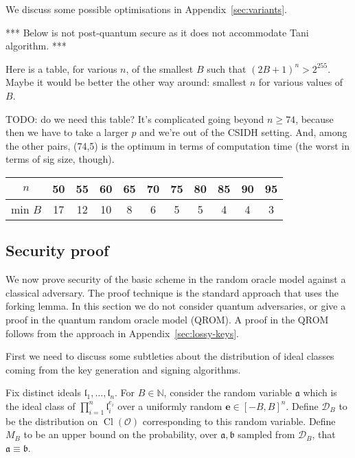 \documentclass{llncs}
\newcommand{\D}{\mathcal{D}}
\newcommand{\N}{\mathbb{N}}
\newcommand{\OO}{\mathcal{O}}
\DeclareMathOperator{\Cl}{Cl}
\renewcommand{\a}{\mathfrak{a}}
\renewcommand{\b}{\mathfrak{b}}
\renewcommand{\l}{\mathfrak{l}}
\newcommand{\e}{\mathbf{e}}
\begin{document}
We discuss some possible optimisations in Appendix~\ref{sec:variants}.


*** Below is not post-quantum secure as it does not accommodate Tani algorithm. ***

Here is a table, for various $n$, of the smallest $B$ such that $(2B+1)^n > 2^{255}$.
Maybe it would be better the other way around: smallest $n$ for various values of $B$.

TODO: do we need this table? It's complicated going beyond $n\ge 74$, because then we have to take a larger $p$ and we're out of the CSIDH setting. And, among the other pairs, (74,5) is the optimum in terms of computation time (the worst in terms of sig size, though).

\begin{center}
\begin{tabular}{c||c|c|c|c|c|c|c|c|c|c}
 $n$     & 50 & 55 & 60 & 65 & 70 & 75 & 80 & 85 & 90 & 95 \\
\hline
 min $B$ & 17 & 12 & 10 &  8 &  6 &  5 &  5 &  4 &  4 &  3 \\
\end{tabular}
\end{center}






\subsection{Security proof}
\label{sec:security-proof}

We now prove security of the basic scheme in the random oracle model against a classical adversary. 
The proof technique is the standard approach that uses the forking lemma.
In this section we do not consider quantum adversaries, or give a proof in the quantum random oracle model (QROM).
A proof in the QROM follows from the approach in Appendix~\ref{sec:lossy-keys}.

First we need to discuss some subtleties about the distribution of ideal classes coming from the key generation and signing algorithms.

\begin{definition} \label{defn:sampling-distributions}
Fix distinct ideals $\l_1, \dots, \l_n$.
For $B \in \N$, consider the random variable $\a$ which is the ideal class of $\prod_{i=1}^n \l_i^{e_i}$ over a uniformly random $\e \in [-B,B]^n$.
Define $\D_B$ to be the distribution on $\Cl( \OO )$ corresponding to this random variable.
%
Define $M_B$ to be an upper bound on the probability, over $\a, \b$ sampled from $\D_B$, that $\a \equiv \b$.
\end{definition}
\end{document}
